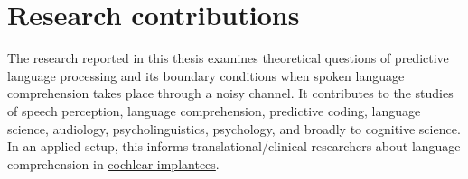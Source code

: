 \documentclass[a4paper, nobind]{templates/ociamthesis}
\begin{document}
\hypertarget{research-contributions}{%
\section{Research contributions}\label{research-contributions}}

The research reported in this thesis examines theoretical questions of predictive language processing and its boundary conditions when spoken language comprehension takes place through a noisy channel.
It contributes to the studies of speech perception, language comprehension, predictive coding, language science, audiology, psycholinguistics, psychology, and broadly to cognitive science.
In an applied setup, this informs translational/clinical researchers about language comprehension in \protect\hyperlink{distortion-degradation}{cochlear implantees}.
\end{document}
